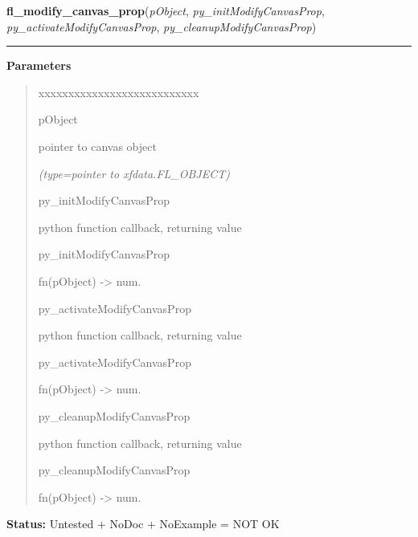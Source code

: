 \hspace{.8\funcindent}\begin{boxedminipage}{\funcwidth}

    \raggedright \textbf{fl\_modify\_canvas\_prop}(\textit{pObject}, \textit{py\_initModifyCanvasProp}, \textit{py\_activateModifyCanvasProp}, \textit{py\_cleanupModifyCanvasProp})

    \vspace{-1.5ex}

    \rule{\textwidth}{0.5\fboxrule}
\setlength{\parskip}{2ex}
\setlength{\parskip}{1ex}
      \textbf{Parameters}
      \vspace{-1ex}

      \begin{quote}
        \begin{Ventry}{xxxxxxxxxxxxxxxxxxxxxxxxxxx}

          \item[pObject]

          pointer to canvas object

            {\it (type=pointer to xfdata.FL\_OBJECT)}

          \item[py\_initModifyCanvasProp]

          python function callback, returning value

          \item[py\_initModifyCanvasProp]

          fn(pObject) -{\textgreater} num.

          \item[py\_activateModifyCanvasProp]

          python function callback, returning value

          \item[py\_activateModifyCanvasProp]

          fn(pObject) -{\textgreater} num.

          \item[py\_cleanupModifyCanvasProp]

          python function callback, returning value

          \item[py\_cleanupModifyCanvasProp]

          fn(pObject) -{\textgreater} num.

        \end{Ventry}

      \end{quote}

\textbf{Status:} Untested + NoDoc + NoExample = NOT OK



    \end{boxedminipage}


